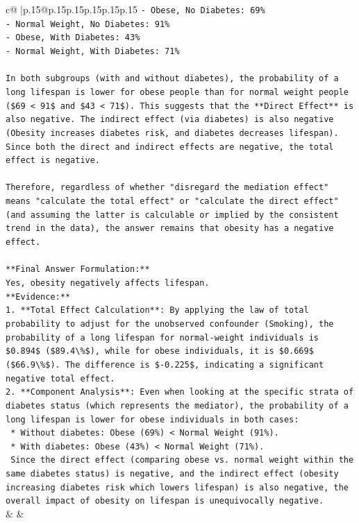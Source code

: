 \documentclass{article}
\begin{document}
{\begin{supertabular}{c@{$\;$}|p{.15\linewidth}@{}p{.15\linewidth}p{.15\linewidth}p{.15\linewidth}p{.15\linewidth}p{.15\linewidth}}
{{{\texttt{{-} Obese, No Diabetes: 69\%} \\
\texttt{{-} Normal Weight, No Diabetes: 91\%} \\
\texttt{{-} Obese, With Diabetes: 43\%} \\
\texttt{{-} Normal Weight, With Diabetes: 71\%} \\
\\ 
\texttt{In both subgroups (with and without diabetes), the probability of a long lifespan is lower for obese people than for normal weight people (\$69 < 91\$ and \$43 < 71\$). This suggests that the **Direct Effect** is also negative. The indirect effect (via diabetes) is also negative (Obesity increases diabetes risk, and diabetes decreases lifespan). Since both the direct and indirect effects are negative, the total effect is negative.} \\
\\ 
\texttt{Therefore, regardless of whether "disregard the mediation effect" means "calculate the total effect" or "calculate the direct effect" (and assuming the latter is calculable or implied by the consistent trend in the data), the answer remains that obesity has a negative effect.} \\
\\ 
\texttt{**Final Answer Formulation:**} \\
\texttt{Yes, obesity negatively affects lifespan.} \\
\texttt{**Evidence:**} \\
\texttt{1.  **Total Effect Calculation**: By applying the law of total probability to adjust for the unobserved confounder (Smoking), the probability of a long lifespan for normal{-}weight individuals is \$0.894\$ (\$89.4\textbackslash{}\%\$), while for obese individuals, it is \$0.669\$ (\$66.9\textbackslash{}\%\$). The difference is \${-}0.225\$, indicating a significant negative total effect.} \\
\texttt{2.  **Component Analysis**: Even when looking at the specific strata of diabetes status (which represents the mediator), the probability of a long lifespan is lower for obese individuals in both cases:} \\
\texttt{    *   Without diabetes: Obese (69\%) < Normal Weight (91\%).} \\
\texttt{    *   With diabetes: Obese (43\%) < Normal Weight (71\%).} \\
\texttt{    Since the direct effect (comparing obese vs. normal weight within the same diabetes status) is negative, and the indirect effect (obesity increasing diabetes risk which lowers lifespan) is also negative, the overall impact of obesity on lifespan is unequivocally negative.} \\
            }
        }
    }
    & & \\ \\


\end{supertabular}}
\end{document}
